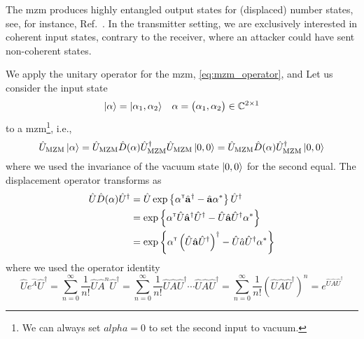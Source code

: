 The \gls{mzm} produces highly entangled output states for (displaced) number states, see, for instance, Ref.~\cite{Windhager2011}.
In the transmitter setting, we are exclusively interested in coherent input states, contrary to the receiver, where an attacker could have sent non-coherent states.

We apply the unitary operator for the \gls{mzm}, \cref{eq:mzm_operator}, and 
Let us consider the input state
\begin{align}
	\ket{\vb{\alpha}}
	&=
	\ket{\alpha_1,\alpha_2}
	&
	\vb{\alpha}
	=
	\begin{pmatrix}
		\alpha_1,
		\alpha_2
	\end{pmatrix}
	\in
	\mathbb{C}^{2\times1}
\end{align}
to a \gls{mzm}\footnote{We can always set $alpha=0$ to set the second input to vacuum.}, i.e.,
\begin{equation}
	\hat{U}_\text{MZM}
	\ket{\vb{\alpha}}
	=
	\hat{U}_\text{MZM}
	\hat{D}(\vb{\alpha})
	\hat{U}_\text{MZM}^\dagger
	\hat{U}_\text{MZM}
	\ket{0,0}
	=
	\hat{U}_\text{MZM}
	\hat{D}(\vb{\alpha})
	\hat{U}_\text{MZM}^\dagger
	\ket{0,0}
\end{equation}
where we used the invariance of the vacuum state $\ket{0,0}$ for the second equal.
The displacement operator transforms as
\begin{equation}
	\begin{split}
		\hat{U}
		\hat{D}(\vb{\alpha})
		\hat{U}^\dagger
		&=
		\hat{U}
		\exp\left\{
			\vb{\alpha}^{\scriptscriptstyle\mathsf{T}}
			\hat{\vb{a}}^\dagger
			-
			\hat{\vb{a}}
			\vb{\alpha}^*
		\right\}
		\hat{U}^\dagger
		\\
		&=
		\exp\left\{
			\vb{\alpha}^{\scriptscriptstyle\mathsf{T}}
			\hat{U}
			\hat{\vb{a}}^\dagger
			\hat{U}^\dagger
			-
			\hat{U}
			\hat{\vb{a}}
			\hat{U}^\dagger
			\vb{\alpha}^*
		\right\}
		\\
		&=
		\exp\left\{
			\vb{\alpha}^{\scriptscriptstyle\mathsf{T}}
			\left(
				\hat{U}
				\hat{\vb{a}}
				\hat{U}^\dagger
			\right)^\dagger
			-
			\hat{U}
			\hat{a}
			\hat{U}^\dagger
			\vb{\alpha}^*
		\right\}
	\end{split}
\end{equation}
where we used the operator identity
\begin{equation}
	\hat{U}
	e^{\hat{A}}
	\hat{U}^\dagger
	=
	\sum_{n=0}^\infty
	\frac{1}{n!}
	\hat{U}
	\hat{A}^n
	\hat{U}^\dagger
	=
	\sum_{n=0}^\infty
	\frac{1}{n!}
	\hat{U}
	\hat{A}
	\hat{U}^\dagger
	\cdots
	\hat{U}
	\hat{A}
	\hat{U}^\dagger
	=
	\sum_{n=0}^\infty
	\frac{1}{n!}
	\left(
		\hat{U}
		\hat{A}
		\hat{U}^\dagger
	\right)^n
	=
	e^{\hat{U}\hat{A}\hat{U}^\dagger}
\end{equation}
